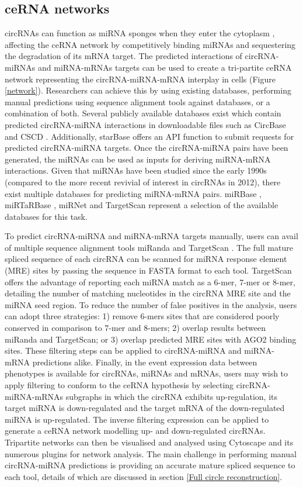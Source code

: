 \documentclass[journal,review,submit,pdftex,moreauthors]{Definitions/mdpi}
\begin{document}
\subsection*{ceRNA networks}
circRNAs can function as miRNA sponges when they enter the cytoplasm \cite{Hansen2013Mar, find_circ}, affecting the ceRNA network by competitively binding miRNAs and sequestering the degradation of its mRNA target. The predicted interactions of circRNA-miRNAs and miRNA-mRNAs targets can be used to create a tri-partite ceRNA network representing the circRNA-miRNA-mRNA interplay in cells (Figure \ref{network}). Researchers can achieve this by using existing databases, performing manual predictions using sequence alignment tools against databases, or a combination of both. Several publicly available databases exist which contain predicted circRNA-miRNA interactions in downloadable files such as CircBase \cite{circbase} and CSCD \cite{CSCD}. Additionally, starBase \cite{starbase} offers an API function to submit requests for predicted circRNA-miRNA targets. Once the circRNA-miRNA pairs have been generated, the miRNAs can be used as inputs for deriving miRNA-mRNA interactions. Given that miRNAs have been studied since the early 1990s (compared to the more recent revivial of interest in circRNAs in 2012), there exist multiple databases for predicting miRNA-mRNA pairs. miRBase \cite{mirbase}, miRTaRBase \cite{mirtarbase}, miRNet \cite{mirnet} and TargetScan \cite{Targetscan} represent a selection of the available databases for this task. \par
To predict circRNA-miRNA and miRNA-mRNA targets manually, users can avail of multiple sequence alignment tools miRanda \cite{miranda} and TargetScan \cite{Targetscan}. The full mature spliced sequence of each circRNA can be scanned for miRNA response element (MRE) sites by passing the sequence in FASTA format to each tool. TargetScan offers the advantage of reporting each miRNA match as a 6-mer, 7-mer or 8-mer, detailing the number of matching nucleotides in the circRNA MRE site and the miRNA seed region. To reduce the number of false positives in the analysis, users can adopt three strategies: 1) remove 6-mers sites that are considered poorly conserved in comparison to 7-mer and 8-mers; 2) overlap results between miRanda and TargetScan; or 3) overlap predicted MRE sites with AGO2 binding sites. These filtering steps can be applied to circRNA-miRNA and miRNA-mRNA predictions alike. Finally, in the event expression data between phenotypes is available for circRNAs, miRNAs and mRNAs, users may wish to apply filtering to conform to the ceRNA hypothesis by selecting circRNA-miRNA-mRNAs subgraphs in which the circRNA exhibits up-regulation, its target miRNA is down-regulated and the target mRNA of the down-regulated miRNA is up-regulated. The inverse filtering expression can be applied to generate a ceRNA network modelling up- and down-regulated circRNAs. Tripartite networks can then be visualised and analysed using Cytoscape \cite{cytoscape} and its numerous plugins for network analysis. The main challenge in performing manual circRNA-miRNA predictions is providing an accurate mature spliced sequence to each tool, details of which are discussed in section \ref{Full circle reconstruction}.
\end{document}
